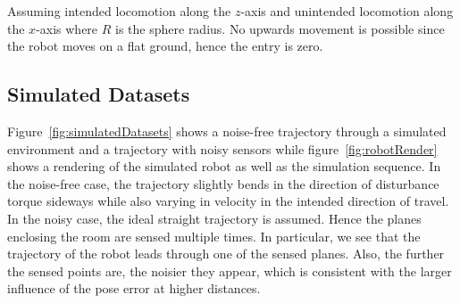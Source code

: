 Assuming intended locomotion along the $z$-axis and unintended locomotion along the $x$-axis where $R$ is the sphere radius.
No upwards movement is possible since the robot moves on a flat ground, hence the entry is zero.

\subsection{Simulated Datasets}

Figure~\ref{fig:simulatedDatasets} shows a noise-free trajectory through a simulated environment and a trajectory with noisy sensors while figure~\ref{fig:robotRender} shows a rendering of the simulated robot as well as the simulation sequence. 
In the noise-free case, the trajectory slightly bends in the direction of disturbance torque sideways while also varying in velocity in the intended direction of travel.
In the noisy case, the ideal straight trajectory is assumed.
Hence the planes enclosing the room are sensed multiple times. 
In particular, we see that the trajectory of the robot leads through one of the sensed planes. 
Also, the further the sensed points are, the noisier they appear, which is consistent with the larger influence of the pose error at higher distances.  


